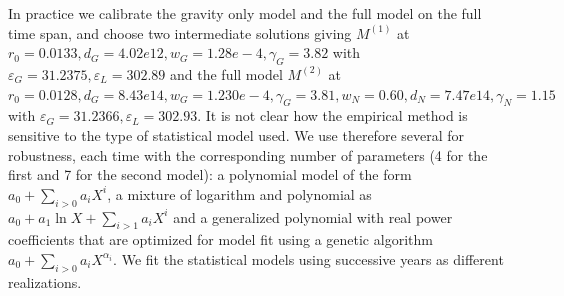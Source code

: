 \documentclass[Royal,sageh,times]{sagej}
\newcommand{\norm}[1]{\left\lVert #1 \right\rVert}
\begin{document}
 


%

%
%


In practice we calibrate the gravity only model and the full model on the full time span, and choose two intermediate solutions giving $M^{(1)}$ at $r_0=0.0133, d_G = 4.02e12, w_G = 1.28e-4, \gamma_G = 3.82$ with $\varepsilon_G=31.2375,\varepsilon_L=302.89$ and the full model $M^{(2)}$ at $r_0=0.0128, d_G = 8.43e14, w_G = 1.230e-4, \gamma_G = 3.81, w_N=0.60, d_N=7.47e14, \gamma_N = 1.15$ with $\varepsilon_G=31.2366,\varepsilon_L=302.93$. It is not clear how the empirical method is sensitive to the type of statistical model used. We use therefore several  for robustness, each time with the corresponding number of parameters (4 for the first and 7 for the second model): a polynomial model of the form $a_0 + \sum_{i>0} a_i X^i$, a mixture of logarithm and polynomial as $a_0 + a_1 \ln X + \sum_{i>1} a_i X^i$ and a generalized polynomial with real power coefficients that are optimized for model fit using a genetic algorithm $a_0 + \sum_{i>0} a_i X^{\alpha_i}$. We fit the statistical models using successive years as different realizations.
\end{document}
